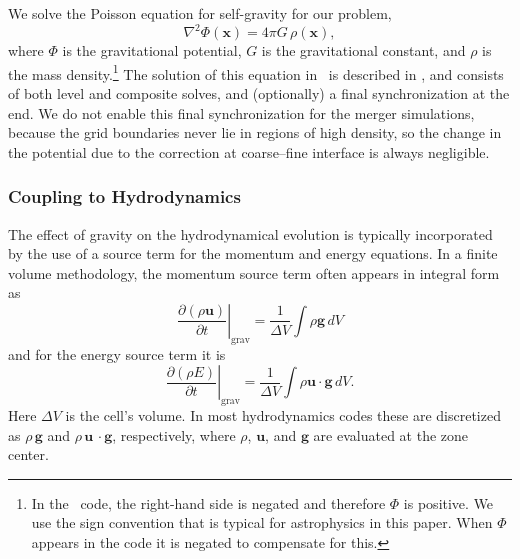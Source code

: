 \documentclass[12pt]{article}
\begin{document}
We solve the Poisson equation for self-gravity for our problem,
\begin{equation}
  \nabla^2 \Phi(\mathbf{x}) = 4\pi G\, \rho(\mathbf{x}),
\end{equation}
where $\Phi$ is the gravitational potential, $G$ is the gravitational
constant, and $\rho$ is the mass density.\footnote{In the \castro\ code, the 
right-hand side is negated and therefore $\Phi$ is positive. We use the 
sign convention that is typical for astrophysics in this paper. 
When $\Phi$ appears in the code it is negated to compensate for this.} 
The solution of this equation in \castro\ is described in \cite{castro}, and
consists of both level and composite solves, and (optionally) a final
synchronization at the end. We do not enable this final synchronization
for the merger simulations, because the grid boundaries never lie in
regions of high density, so the change in the potential due to the correction
at coarse--fine interface is always negligible.

\subsubsection{Coupling to Hydrodynamics}\label{sec:gravity_hydro_coupling}

The effect of gravity on the hydrodynamical evolution is typically
incorporated by the use of a source term for the momentum and energy
equations. In a finite volume methodology, the momentum source term 
often appears in integral form as
\begin{equation}
  \left.\frac{\partial (\rho \mathbf{u})}{\partial t}\right|_{\text{grav}} = \frac{1}{\Delta V} \int \rho \mathbf{g}\, dV
\end{equation}
and for the energy source term it is
\begin{equation}
  \left.\frac{\partial (\rho E)}{\partial t}\right|_{\text{grav}} = \frac{1}{\Delta V} \int \rho \mathbf{u}\cdot\mathbf{g}\, dV \label{eq:cell_center_gravity_source}.
\end{equation}
Here $\Delta V$ is the cell's volume.
In most hydrodynamics codes these are discretized as $\rho\,
\mathbf{g}$ and $\rho\, \mathbf{u}\,\cdot\mathbf{g}$, respectively, 
where $\rho$, $\mathbf{u}$, and $\mathbf{g}$ 
are evaluated at the zone center. 
\end{document}
